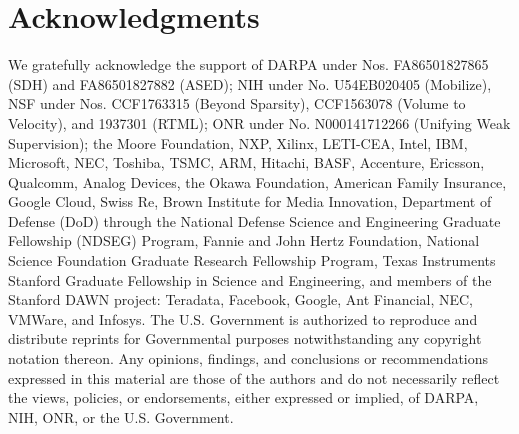 \section*{Acknowledgments}

We gratefully acknowledge the support of DARPA under Nos. FA86501827865 (SDH) and FA86501827882 (ASED); NIH under No. U54EB020405 (Mobilize), NSF under Nos. CCF1763315 (Beyond Sparsity), CCF1563078 (Volume to Velocity), and 1937301 (RTML); ONR under No. N000141712266 (Unifying Weak Supervision); the Moore Foundation, NXP, Xilinx, LETI-CEA, Intel, IBM, Microsoft, NEC, Toshiba, TSMC, ARM, Hitachi, BASF, Accenture, Ericsson, Qualcomm, Analog Devices, the Okawa Foundation, American Family Insurance, Google Cloud, Swiss Re,
Brown Institute for Media Innovation,
Department of Defense (DoD) through the National Defense Science and
Engineering Graduate Fellowship (NDSEG) Program, 
Fannie and John Hertz Foundation,
National Science Foundation Graduate Research Fellowship Program,
Texas Instruments Stanford Graduate Fellowship in Science and Engineering,
and members of the Stanford DAWN project: Teradata, Facebook, Google, Ant Financial, NEC, VMWare, and Infosys. The U.S. Government is authorized to reproduce and distribute reprints for Governmental purposes notwithstanding any copyright notation thereon. Any opinions, findings, and conclusions or recommendations expressed in this material are those of the authors and do not necessarily reflect the views, policies, or endorsements, either expressed or implied, of DARPA, NIH, ONR, or the U.S. Government.
